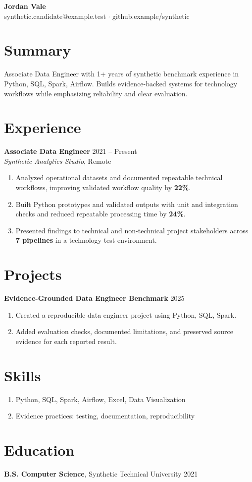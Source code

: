 \documentclass[10pt,letterpaper]{article}
\begin{document}
\begin{center}
{\Large \textbf{Jordan Vale}}\\
synthetic.candidate@example.test $\cdot$ github.example/synthetic
\end{center}

\section*{Summary}
Associate Data Engineer with 1+ years of synthetic benchmark experience in Python, SQL, Spark, Airflow. Builds evidence-backed systems for technology workflows while emphasizing reliability and clear evaluation.

\section*{Experience}
\textbf{Associate Data Engineer} \hfill 2021 -- Present\\
\textit{Synthetic Analytics Studio}, Remote
\begin{enumerate}
  \item Analyzed operational datasets and documented repeatable technical workflows, improving validated workflow quality by \textbf{22\%}.
  \item Built Python prototypes and validated outputs with unit and integration checks and reduced repeatable processing time by \textbf{24\%}.
  \item Presented findings to technical and non-technical project stakeholders across \textbf{7 pipelines} in a technology test environment.
\end{enumerate}

\section*{Projects}
\textbf{Evidence-Grounded Data Engineer Benchmark} \hfill 2025
\begin{enumerate}
  \item Created a reproducible data engineer project using Python, SQL, Spark.
  \item Added evaluation checks, documented limitations, and preserved source evidence for each reported result.
\end{enumerate}

\section*{Skills}
\begin{enumerate}
  \item Python, SQL, Spark, Airflow, Excel, Data Visualization
  \item Evidence practices: testing, documentation, reproducibility
\end{enumerate}

\section*{Education}
\textbf{B.S. Computer Science}, Synthetic Technical University \hfill 2021
\end{document}
